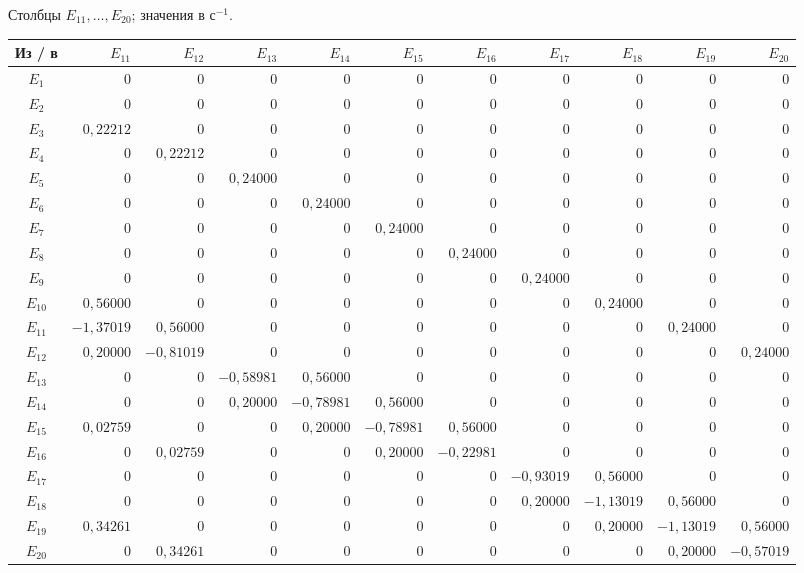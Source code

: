 \documentclass[12pt,a4paper]{article}
\begin{document}
\noindent Столбцы $E_{11},\ldots,E_{20}$; значения в $\text{с}^{-1}$.
\begin{center}\scriptsize\setlength{\tabcolsep}{2.6pt}\renewcommand{\arraystretch}{1.18}
\begin{tabular}{|c|r|r|r|r|r|r|r|r|r|r|}\hline
Из / в&$E_{11}$&$E_{12}$&$E_{13}$&$E_{14}$&$E_{15}$&$E_{16}$&$E_{17}$&$E_{18}$&$E_{19}$&$E_{20}$\\\hline
$E_{1}$&$0$&$0$&$0$&$0$&$0$&$0$&$0$&$0$&$0$&$0$\\\hline
$E_{2}$&$0$&$0$&$0$&$0$&$0$&$0$&$0$&$0$&$0$&$0$\\\hline
$E_{3}$&$0{,}22212$&$0$&$0$&$0$&$0$&$0$&$0$&$0$&$0$&$0$\\\hline
$E_{4}$&$0$&$0{,}22212$&$0$&$0$&$0$&$0$&$0$&$0$&$0$&$0$\\\hline
$E_{5}$&$0$&$0$&$0{,}24000$&$0$&$0$&$0$&$0$&$0$&$0$&$0$\\\hline
$E_{6}$&$0$&$0$&$0$&$0{,}24000$&$0$&$0$&$0$&$0$&$0$&$0$\\\hline
$E_{7}$&$0$&$0$&$0$&$0$&$0{,}24000$&$0$&$0$&$0$&$0$&$0$\\\hline
$E_{8}$&$0$&$0$&$0$&$0$&$0$&$0{,}24000$&$0$&$0$&$0$&$0$\\\hline
$E_{9}$&$0$&$0$&$0$&$0$&$0$&$0$&$0{,}24000$&$0$&$0$&$0$\\\hline
$E_{10}$&$0{,}56000$&$0$&$0$&$0$&$0$&$0$&$0$&$0{,}24000$&$0$&$0$\\\hline
$E_{11}$&$-1{,}37019$&$0{,}56000$&$0$&$0$&$0$&$0$&$0$&$0$&$0{,}24000$&$0$\\\hline
$E_{12}$&$0{,}20000$&$-0{,}81019$&$0$&$0$&$0$&$0$&$0$&$0$&$0$&$0{,}24000$\\\hline
$E_{13}$&$0$&$0$&$-0{,}58981$&$0{,}56000$&$0$&$0$&$0$&$0$&$0$&$0$\\\hline
$E_{14}$&$0$&$0$&$0{,}20000$&$-0{,}78981$&$0{,}56000$&$0$&$0$&$0$&$0$&$0$\\\hline
$E_{15}$&$0{,}02759$&$0$&$0$&$0{,}20000$&$-0{,}78981$&$0{,}56000$&$0$&$0$&$0$&$0$\\\hline
$E_{16}$&$0$&$0{,}02759$&$0$&$0$&$0{,}20000$&$-0{,}22981$&$0$&$0$&$0$&$0$\\\hline
$E_{17}$&$0$&$0$&$0$&$0$&$0$&$0$&$-0{,}93019$&$0{,}56000$&$0$&$0$\\\hline
$E_{18}$&$0$&$0$&$0$&$0$&$0$&$0$&$0{,}20000$&$-1{,}13019$&$0{,}56000$&$0$\\\hline
$E_{19}$&$0{,}34261$&$0$&$0$&$0$&$0$&$0$&$0$&$0{,}20000$&$-1{,}13019$&$0{,}56000$\\\hline
$E_{20}$&$0$&$0{,}34261$&$0$&$0$&$0$&$0$&$0$&$0$&$0{,}20000$&$-0{,}57019$\\\hline
\end{tabular}\end{center}
\end{document}
